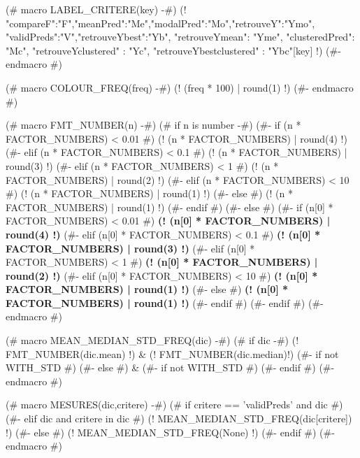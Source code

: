 (# macro LABEL_CRITERE(key) -#)
{\small (! {"compareF":"F","meanPred":"Me","modalPred":"Mo","retrouveY":"Ymo",
"validPreds":"V","retrouveYbest":"Yb", "retrouveYmean": "Yme", "clusteredPred": "Mc",
"retrouveYclustered" : "Yc", "retrouveYbestclustered" : "Ybc"}[key] !)  }
(#- endmacro #)

(# macro COLOUR_FREQ(freq) -#)
\textcolor[rgb]{ (! (2 * (1.1 - freq))  | round(3) | truncate01 !) , (! (2 * freq - 1.3) | round(3) | truncate01 !) , 0.1}{(! (freq * 100) | round(1) !)}
(#- endmacro #)

(# macro FMT_NUMBER(n) -#)
(# if n is number -#)
(#- if (n  * FACTOR_NUMBERS) < 0.01 #)
(! (n  * FACTOR_NUMBERS) | round(4) !)
(#- elif (n  * FACTOR_NUMBERS) < 0.1 #)
(! (n  * FACTOR_NUMBERS) | round(3) !)
(#- elif (n  * FACTOR_NUMBERS) < 1 #)
(! (n  * FACTOR_NUMBERS) | round(2) !)
(#- elif (n  * FACTOR_NUMBERS) < 10 #)
(! (n  * FACTOR_NUMBERS) | round(1) !)
(#- else #)
(! (n  * FACTOR_NUMBERS) | round(1) !)
(#- endif #)
(#- else #)
(#- if (n[0] * FACTOR_NUMBERS) < 0.01 #)
\textbf{ (! (n[0] * FACTOR_NUMBERS) | round(4) !)}
(#- elif (n[0] * FACTOR_NUMBERS) < 0.1 #)
\textbf{ (! (n[0] * FACTOR_NUMBERS) | round(3) !)}
(#- elif (n[0] * FACTOR_NUMBERS) < 1 #)
\textbf{ (! (n[0] * FACTOR_NUMBERS) | round(2) !)}
(#- elif (n[0] * FACTOR_NUMBERS) < 10 #)
\textbf{ (! (n[0] * FACTOR_NUMBERS) | round(1) !)}
(#- else #)
\textbf{ (! (n[0] * FACTOR_NUMBERS) | round(1) !)}
(#- endif #)
(#- endif #)
(#- endmacro #)


(# macro MEAN_MEDIAN_STD_FREQ(dic) -#)
(# if dic -#)
(! FMT_NUMBER(dic.mean) !) & {\footnotesize (! FMT_NUMBER(dic.median)!) } (#- if not WITH_STD #) %
(#- else #)
& (#- if not WITH_STD #) %
(#- endif #)
(#- endmacro #)


(# macro MESURES(dic,critere) -#)
(# if critere == 'validPreds' and dic #)
(#- elif dic and critere in dic #)
    (!  MEAN_MEDIAN_STD_FREQ(dic[critere]) !)
(#- else #)
(! MEAN_MEDIAN_STD_FREQ(None) !)
(#- endif #)
(#- endmacro #)
